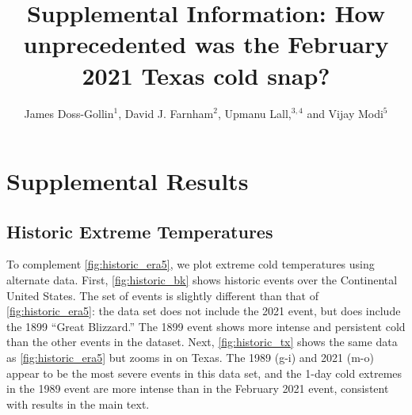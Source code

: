 \documentclass[12pt]{iopart}
\begin{document}
\title{Supplemental Information: How unprecedented was the February 2021 Texas cold snap?}

\author{James Doss-Gollin$^1$, David J. Farnham$^2$, Upmanu Lall,$^{3,4}$ and Vijay Modi$^5$}
\address{$^1$ Department of Civil and Environmental Engineering, Rice University, Houston, TX, USA (ORCID 0000-0002-3428-2224)}
\address{$^2$ Department of Global Ecology, Carnegie Institution for Science, Stanford, CA, USA (ORCID 0000-0002-6690-4251)}
\address{$^3$ Columbia Water Center, Columbia University, New York, NY, USA (ORCID 0000-0003-0529-8128)}
\address{$^4$ Department of Earth and Environmental Engineering, Columbia University, New York, NY, USA}
\address{$^4$ Department of Mechanical Engineering, Columbia University, New York, NY, USA (ORCID 0000-0003-2513-0437)}
\vspace{10pt}

\submitto{\ERL}
\maketitle

\section{Supplemental Results}
\renewcommand{\thefigure}{S\arabic{figure}}
\setcounter{figure}{0}

\subsection{Historic Extreme Temperatures}

To complement \cref{fig:historic_era5}, we plot extreme cold temperatures using alternate data.
First, \cref{fig:historic_bk} shows historic events over the Continental United States.
The set of events is slightly different than that of \cref{fig:historic_era5}: the data set does not include the 2021 event, but does include the 1899 ``Great Blizzard.''
The 1899 event shows more intense and persistent cold than the other events in the dataset.
Next, \cref{fig:historic_tx} shows the same data as \cref{fig:historic_era5} but zooms in on Texas.
The 1989 (g-i) and 2021 (m-o) appear to be the most severe events in this data set, and the 1-day cold extremes in the 1989 event are more intense than in the February 2021 event, consistent with results in the main text.
\end{document}
